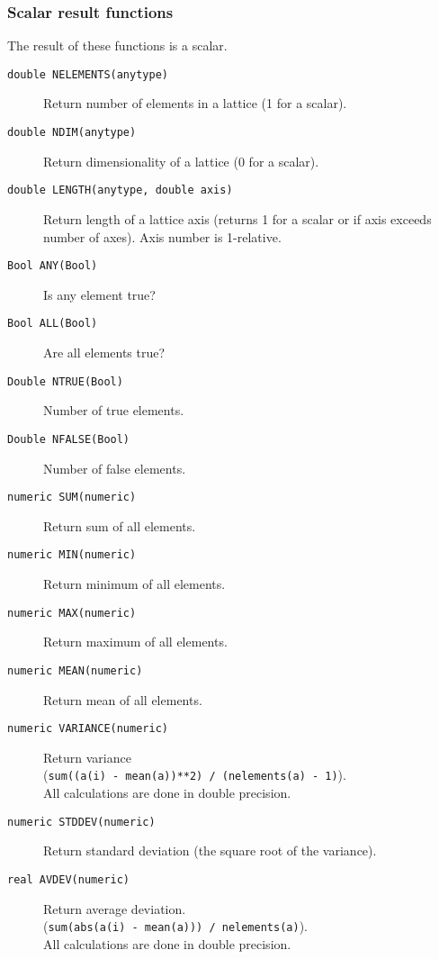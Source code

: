 \subsubsection{Scalar result functions}
The result of these functions is a scalar.
\begin{description}
  \item[ \texttt{double NELEMENTS(anytype)}]
    Return number of elements in a lattice (1 for a scalar).
  \item[ \texttt{double NDIM(anytype)}]
    Return dimensionality of a lattice (0 for a scalar).
  \item[ \texttt{double LENGTH(anytype, double axis)}]
    Return length of a lattice axis (returns 1 for a scalar or if axis
    exceeds number of axes). Axis number is 1-relative.
  \item[ \texttt{Bool ANY(Bool)}] Is any element true?
  \item[ \texttt{Bool ALL(Bool)}] Are all elements true?
  \item[ \texttt{Double NTRUE(Bool)}] Number of true elements.
  \item[ \texttt{Double NFALSE(Bool)}] Number of false elements.
  \item[ \texttt{numeric SUM(numeric)}] Return sum of all elements.
  \item[ \texttt{numeric MIN(numeric)}] Return minimum
    of all elements.
  \item[ \texttt{numeric MAX(numeric)}] Return maximum
    of all elements.
  \item[ \texttt{numeric MEAN(numeric)}]
    Return mean of all elements.
  \item[ \texttt{numeric VARIANCE(numeric)}]
    Return variance
    \\(\texttt{sum((a(i) - mean(a))**2) / (nelements(a) - 1)}).
    \\All calculations are done in double precision.
  \item[ \texttt{numeric STDDEV(numeric)}]
    Return standard deviation (the square root of the variance).
  \item[ \texttt{real AVDEV(numeric)}]
    Return average deviation.
    \\(\texttt{sum(abs(a(i) - mean(a))) / nelements(a)}).
    \\All calculations are done in double precision.
\end{description}

